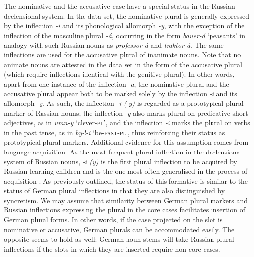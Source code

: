 The nominative and the accusative case have a special status in the Russian declensional system. In the data set, the nominative plural is generally expressed by the inflection \textit{-i} and its phonological allomorph \textit{-y}, with the exception of the inflection of the masculine plural \textit{-á}, occurring in the form \textit{bauer-á} `peasants' in analogy with such Russian nouns as \textit{professor-á} and \textit{traktor-á}. The same inflections are used for the accusative plural of inanimate nouns. Note that no animate nouns are attested in the data set in the form of the accusative plural (which require inflections identical with the genitive plural). In other words, apart from one instance of the inflection \textit{-a}, the nominative plural and the accusative plural appear both to be marked solely by the inflection \textit{-i} and its allomorph \textit{-y}. As such, the inflection \textit{-i (-y)} is regarded as a prototypical plural marker of Russian nouns; the inflection \textit{-y} also marks plural on predicative short adjectives, as in \textit{umn-y} `clever-\textsc{pl}', and the inflection \textit{-i} marks the plural on verbs in the past tense, as in \textit{by-l-i} `be-\textsc{past-pl}', thus reinforcing their status as prototypical plural markers. Additional evidence for this assumption comes from language acquisition. As the most frequent plural inflection in the declensional system of Russian nouns, \textit{-i (y)} is the first plural inflection to be acquired by Russian learning children and is the one most often generalised in the process of acquisition \citep{gagarina-voeikova}. As previously outlined, the status of this formative is similar to the status of German plural inflections in that they are also distinguished by syncretism. We may assume that similarity between German plural markers and Russian inflections expressing the plural in the core cases facilitates insertion of German plural forms. In other words, if the case projected on the slot is nominative or accusative, German plurals can be accommodated easily. The opposite seems to hold as well: German noun stems will take Russian plural inflections if the slots in which they are inserted require non-core cases.

